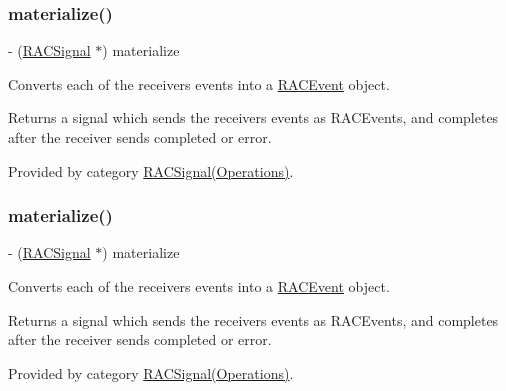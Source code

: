 \subsubsection{\texorpdfstring{materialize()}{materialize()}\hspace{0.1cm}{\footnotesize\ttfamily [1/3]}}
{\footnotesize\ttfamily -\/ (\mbox{\hyperlink{interface_r_a_c_signal}{R\+A\+C\+Signal}} $\ast$) materialize \begin{DoxyParamCaption}{ }\end{DoxyParamCaption}}

Converts each of the receiver\textquotesingle{}s events into a \mbox{\hyperlink{interface_r_a_c_event}{R\+A\+C\+Event}} object.

Returns a signal which sends the receiver\textquotesingle{}s events as R\+A\+C\+Events, and completes after the receiver sends {\ttfamily completed} or {\ttfamily error}. 

Provided by category \mbox{\hyperlink{category_r_a_c_signal_07_operations_08_a2b970ec1845b139478ba31f00fe34b71}{R\+A\+C\+Signal(\+Operations)}}.

\mbox{\label{interface_r_a_c_signal_a2b970ec1845b139478ba31f00fe34b71}} 
\subsubsection{\texorpdfstring{materialize()}{materialize()}\hspace{0.1cm}{\footnotesize\ttfamily [2/3]}}
{\footnotesize\ttfamily -\/ (\mbox{\hyperlink{interface_r_a_c_signal}{R\+A\+C\+Signal}} $\ast$) materialize \begin{DoxyParamCaption}{ }\end{DoxyParamCaption}}

Converts each of the receiver\textquotesingle{}s events into a \mbox{\hyperlink{interface_r_a_c_event}{R\+A\+C\+Event}} object.

Returns a signal which sends the receiver\textquotesingle{}s events as R\+A\+C\+Events, and completes after the receiver sends {\ttfamily completed} or {\ttfamily error}. 

Provided by category \mbox{\hyperlink{category_r_a_c_signal_07_operations_08_a2b970ec1845b139478ba31f00fe34b71}{R\+A\+C\+Signal(\+Operations)}}.

